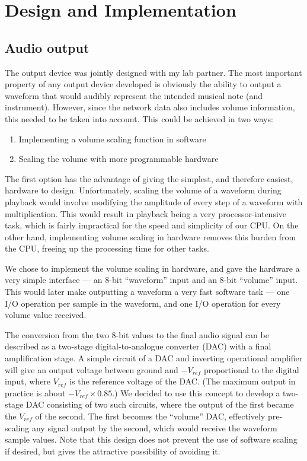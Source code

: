 \chapter{Design and Implementation}

\section{Audio output}
\label{sec:design:audio_output}

The output device was jointly designed with my lab partner.  The most important property of any 
output device developed is obviously the ability to output a waveform that would audibly represent 
the intended musical note (and instrument).  However, since the network data also includes volume 
information, this needed to be taken into account.  This could be achieved in two ways:
\begin{enumerate}
\item Implementing a volume scaling function in software
\item Scaling the volume with more programmable hardware
\end{enumerate}
The first option has the advantage of giving the simplest, and therefore easiest, hardware to 
design.  Unfortunately, scaling the volume of a waveform during playback would involve modifying the 
amplitude of every step of a waveform with multiplication.  This would result in playback being a 
very processor-intensive task, which is fairly impractical for the speed and simplicity of our CPU.  
On the other hand, implementing volume scaling in hardware removes this burden from the CPU, freeing 
up the processing time for other tasks.

We chose to implement the volume scaling in hardware, and gave the hardware a very simple interface 
--- an 8-bit ``waveform'' input and an 8-bit ``volume'' input.  This would later make outputting a 
waveform a very fast software task --- one I/O operation per sample in the waveform, and one I/O 
operation for every volume value received.

The conversion from the two 8-bit values to the final audio signal can be described as a two-stage 
digital-to-analogue converter (DAC) with a final amplification stage.  A simple circuit of a DAC and 
inverting operational amplifier will give an output voltage between ground and $-V_{ref}$ 
proportional to the digital input, where $V_{ref}$ is the reference voltage of the DAC.  (The 
maximum output in practice is about $-V_{ref}\times0.85$.)  We decided to use this concept to 
develop a two-stage DAC consisting of two such circuits, where the output of the first became the 
$V_{ref}$ of the second.  The first becomes the ``volume'' DAC, effectively pre-scaling any signal 
output by the second, which would receive the waveform sample values.  Note that this design does 
not prevent the use of software scaling if desired, but gives the attractive possibility of avoiding 
it.

